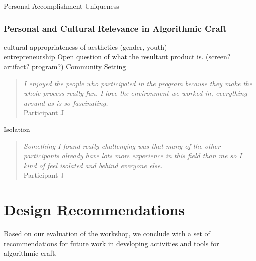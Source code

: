 \documentclass{sigchi}
\begin{document}
Personal Accomplishment
Uniqueness

\subsubsection{Personal and Cultural Relevance in Algorithmic Craft}

cultural appropriateness of aesthetics (gender, youth)\\

entrepreneurship
Open question of what the resultant product is. (screen? artifact? program?)
Community Setting\\
 \begin{quotation}
\textit{I enjoyed the people who participated in the program because they make the whole process really fun. I love the environment we worked in, everything around us is so fascinating.}
\\Participant J
\end{quotation}

Isolation\\
 \begin{quotation}
\textit{Something I found really challenging was that many of the other participants already have lots more experience in this field than me so I kind of feel isolated and behind everyone else.}
\\Participant J
\end{quotation}


\section{Design Recommendations}
Based on our evaluation of the workshop, we conclude with a set of recommendations for future work in developing activities and tools for algorithmic craft. 
\end{document}
